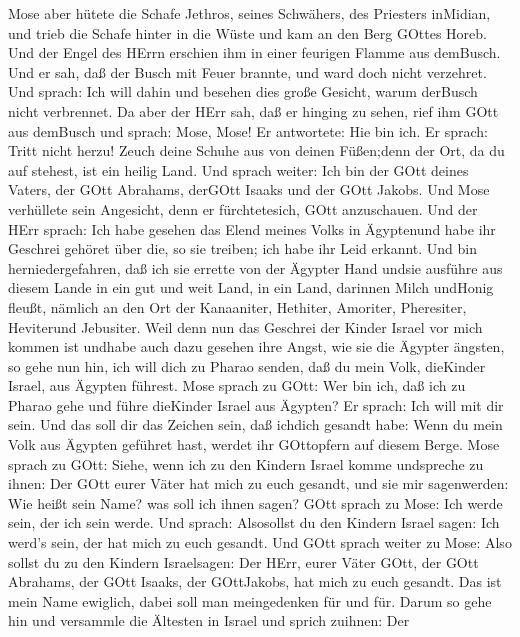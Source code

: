  Mose aber hütete die Schafe Jethros, seines Schwähers, des
Priesters inMidian, und trieb die Schafe hinter in die Wüste und kam an
den Berg GOttes Horeb.  Und der Engel des HErrn erschien ihm
in einer feurigen Flamme aus demBusch. Und er sah, daß der Busch mit
Feuer brannte, und ward doch nicht verzehret.  Und sprach:
Ich will dahin und besehen dies große Gesicht, warum derBusch nicht
verbrennet.  Da aber der HErr sah, daß er hinging zu sehen,
rief ihm GOtt aus demBusch und sprach: Mose, Mose! Er antwortete: Hie
bin ich.  Er sprach: Tritt nicht herzu! Zeuch deine Schuhe
aus von deinen Füßen;denn der Ort, da du auf stehest, ist ein heilig
Land.  Und sprach weiter: Ich bin der GOtt deines Vaters,
der GOtt Abrahams, derGOtt Isaaks und der GOtt Jakobs. Und Mose
verhüllete sein Angesicht, denn er fürchtetesich, GOtt anzuschauen.
 Und der HErr sprach: Ich habe gesehen das Elend meines
Volks in Ägyptenund habe ihr Geschrei gehöret über die, so sie treiben;
ich habe ihr Leid erkannt.  Und bin herniedergefahren, daß
ich sie errette von der Ägypter Hand undsie ausführe aus diesem Lande in
ein gut und weit Land, in ein Land, darinnen Milch undHonig fleußt,
nämlich an den Ort der Kanaaniter, Hethiter, Amoriter, Pheresiter,
Heviterund Jebusiter.  Weil denn nun das Geschrei der Kinder
Israel vor mich kommen ist undhabe auch dazu gesehen ihre Angst, wie sie
die Ägypter ängsten,  so gehe nun hin, ich will dich zu
Pharao senden, daß du mein Volk, dieKinder Israel, aus Ägypten führest.
 Mose sprach zu GOtt: Wer bin ich, daß ich zu Pharao gehe
und führe dieKinder Israel aus Ägypten?  Er sprach: Ich
will mit dir sein. Und das soll dir das Zeichen sein, daß ichdich
gesandt habe: Wenn du mein Volk aus Ägypten geführet hast, werdet ihr
GOttopfern auf diesem Berge.  Mose sprach zu GOtt: Siehe,
wenn ich zu den Kindern Israel komme undspreche zu ihnen: Der GOtt eurer
Väter hat mich zu euch gesandt, und sie mir sagenwerden: Wie heißt sein
Name? was soll ich ihnen sagen?  GOtt sprach zu Mose: Ich
werde sein, der ich sein werde. Und sprach: Alsosollst du den Kindern
Israel sagen: Ich werd's sein, der hat mich zu euch gesandt.
 Und GOtt sprach weiter zu Mose: Also sollst du zu den
Kindern Israelsagen: Der HErr, eurer Väter GOtt, der GOtt Abrahams, der
GOtt Isaaks, der GOttJakobs, hat mich zu euch gesandt. Das ist mein Name
ewiglich, dabei soll man meingedenken für und für.  Darum
so gehe hin und versammle die Ältesten in Israel und sprich zuihnen: Der
